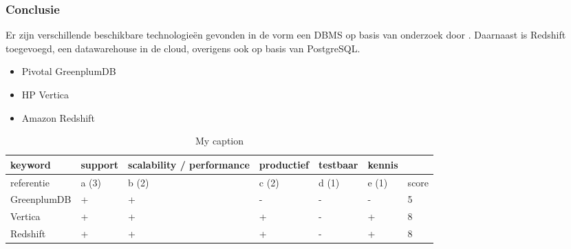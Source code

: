 \subsubsection{\textbf{Conclusie}}

Er zijn verschillende beschikbare technologieën gevonden in de vorm een DBMS op basis van onderzoek door \textcite{dewitt2006build}. Daarnaast is Redshift toegevoegd, een datawarehouse in de cloud, overigens ook op basis van PostgreSQL.


\begin{itemize}
    \item Pivotal GreenplumDB
    \item HP Vertica
    \item Amazon Redshift
\end{itemize}


\begin{table}[bh]
\caption{My caption}
\label{tab:matrix_databasese}
\begin{tabular}{|l|l|l|l|l|l|l|}
\hline
keyword     & support & scalability / performance & productief & testbaar & kennis &       \\ \hline
referentie  & a (3)   & b (2)                     & c (2)      & d (1)    & e (1)  & score \\ \hline
GreenplumDB & +       & +                         & -          & -        & -      & 5     \\ \hline
Vertica     & +       & +                         & +          & -        & +      & 8     \\ \hline
Redshift    & +       & +                         & +          & -        & +      & 8     \\ \hline
\end{tabular}
\end{table}